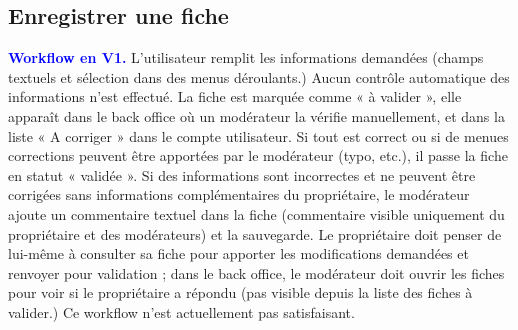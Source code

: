 ﻿\documentclass[a4paper,10pt]{article}
\newcommand\existant[1]{\noindent\textbf{\textcolor{blue}{#1}}}
\begin{document}
\subsection{Enregistrer une fiche}

\existant{Workflow en V1.} L'utilisateur remplit les informations demandées (champs textuels et sélection dans des menus déroulants.) Aucun contrôle automatique des informations n'est effectué. La fiche est marquée comme « à valider », elle apparaît dans le back office où un modérateur la vérifie manuellement, et dans la liste « A corriger » dans le compte utilisateur. Si tout est correct ou si de menues corrections peuvent être apportées par le modérateur (typo, etc.), il passe la fiche en statut « validée ». Si des informations sont incorrectes et ne peuvent être corrigées sans informations complémentaires du propriétaire, le modérateur ajoute un commentaire textuel dans la fiche (commentaire visible uniquement du propriétaire et des modérateurs) et la sauvegarde. Le propriétaire doit penser de lui-même à consulter sa fiche pour apporter les modifications demandées et renvoyer pour validation ; dans le back office, le modérateur doit ouvrir les fiches pour voir si le propriétaire a répondu (pas visible depuis la liste des fiches à valider.) Ce workflow n'est actuellement pas satisfaisant.
\end{document}
